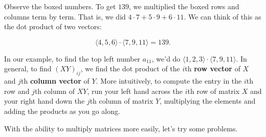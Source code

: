 \documentclass[../gatm.tex]{subfiles}
\begin{document}
Observe the boxed numbers. To get $139$, we multiplied the boxed rows and columns term by term. That is, we did $4\cdot 7 + 5\cdot 9 + 6\cdot 11$. We can think of this as the dot product of two vectors:

$$\langle 4, 5, 6\rangle \cdot \langle 7, 9, 11\rangle = 139.$$

In our example, to find the top left number $a_{11}$, we'd do $\langle 1,2,3\rangle \cdot \langle 7,9,11\rangle$. In general, to find $(XY)_{ij}$, we find the dot product of the $i$th \textbf{row vector} of $X$ and $j$th \textbf{column vector} of $Y$. More intuitively, to compute the entry in the $i$th row and $j$th column of $XY$, run your left hand across the $i$th row of matrix $X$ and your right hand down the $j$th column of matrix $Y$, multiplying the elements and adding the products as you go along.

With the ability to multiply matrices more easily, let's try some problems.
\end{document}
